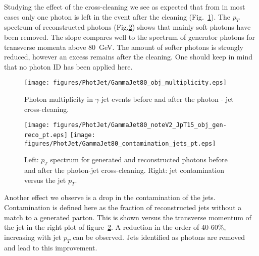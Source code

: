 \documentclass{cmspaper}
\begin{document}
Studying the effect of the cross-cleaning  we see as expected that from in most
cases only one photon is left in the event after the cleaning
(Fig.~\ref{fig:pjPhotMult}). The $p_T$ spectrum of reconstructed photons
(Fig.\ref{fig:pjPhotCont}) shows that mainly soft photons have been removed.
The slope compares well to the spectrum of generator photons for transverse
momenta above 80\ GeV. The amount of softer photons is strongly reduced,
however an excess remains after the cleaning. One should keep in mind that no
photon ID has been applied here.
\begin{figure}[hbtp]
  \begin{center}
    \texttt{[image: figures/PhotJet/GammaJet80\_obj\_multiplicity.eps]}
    \caption{Photon multiplicity in $\gamma$-jet events before and after the
    photon - jet cross-cleaning.}
    \label{fig:pjPhotMult}
  \end{center}
\end{figure}
\begin{figure}[hbtp]
  \begin{center}
    \texttt{[image: figures/PhotJet/GammaJet80\_noteV2\_JpT15\_obj\_gen-reco\_pt.eps]}
    \texttt{[image: figures/PhotJet/GammaJet80\_contamination\_jets\_pt.eps]}
    \caption{Left: $p_T$ spectrum for generated and reconstructed photons
    before and after the photon-jet cross-cleaning. Right: jet contamination
    versus the jet $p_T$.}
    \label{fig:pjPhotCont}
  \end{center}
\end{figure}

Another effect we observe is a drop in the contamination of the jets.
Contamination is defined here as the fraction of reconstructed jets without a
match to a generated parton. This is shown versus the transverse momentum of
the jet in the right plot of figure~\ref{fig:pjPhotCont}. A reduction in the
order of 40-60\%, increasing with jet $p_T$ can be observed. Jets identified as
photons are removed and lead to this improvement.
\end{document}
